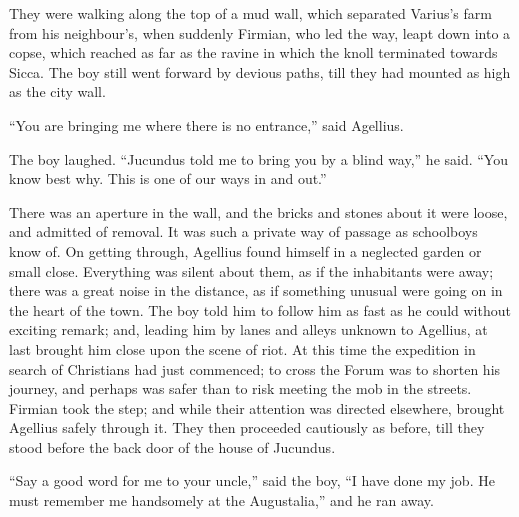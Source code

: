 They were walking along the top of a mud wall, which separated
Varius's farm from his neighbour's, when suddenly Firmian, who led the
way, leapt down into a copse, which reached as far as the ravine in
which the knoll terminated towards Sicca. The boy still went forward
by devious paths, till they had mounted as high as the city wall.

``You are bringing me where there is no entrance,'' said
Agellius.

The boy laughed. ``Jucundus told me to bring you by a blind
way,'' he said. ``You know best why. This is one of our ways
in and out.''

There was an aperture in the wall, and the bricks and stones about
it were loose, and admitted of removal. It was such a private way of
passage as schoolboys know of. On getting through, Agellius found
himself in a neglected garden or small close. Everything was silent
about them, as if the inhabitants were away; there was a great
noise in the distance, as if something unusual were going on in the
heart of the town. The boy told him to follow him as fast as he could
without exciting remark; and, leading him by lanes and alleys unknown
to Agellius, at last brought him close upon the scene of riot. At this
time the expedition in search of Christians had just commenced; to
cross the Forum was to shorten his journey, and perhaps was safer than
to risk meeting the mob in the streets. Firmian took the step; and
while their attention was directed elsewhere, brought Agellius safely
through it. They then proceeded cautiously as before, till they stood
before the back door of the house of Jucundus.

``Say a good word for me to your uncle,'' said the boy,
``I have done my job. He must remember me handsomely at the
Augustalia,'' and he ran away.

